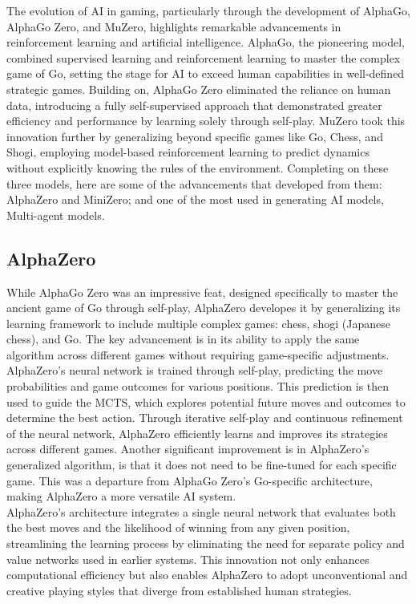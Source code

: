 The evolution of AI in gaming, particularly through the development of AlphaGo,
AlphaGo Zero, and MuZero, highlights remarkable advancements in reinforcement
learning and artificial intelligence. AlphaGo, the pioneering model, combined
supervised learning and reinforcement learning to master the complex game of
Go, setting the stage for AI to exceed human capabilities in well-defined
strategic games. Building on, AlphaGo Zero eliminated the reliance on human
data, introducing a fully self-supervised approach that demonstrated greater
efficiency and performance by learning solely through self-play. MuZero took
this innovation further by generalizing beyond specific games like Go, Chess,
and Shogi, employing model-based reinforcement learning to predict dynamics
without explicitly knowing the rules of the environment. Completing on these
three models, here are some of the advancements that developed from them:
AlphaZero and MiniZero; and one of the most used in generating AI models,
Multi-agent models.
\subsection*{AlphaZero}
While AlphaGo Zero was an impressive feat, designed specifically to master the
ancient game of Go through self-play, AlphaZero developes it by generalizing
its learning framework to include multiple complex games: chess, shogi
(Japanese chess), and Go. The key advancement is in its ability to apply the
same algorithm across different games without requiring game-specific
adjustments. AlphaZero's neural network is trained through self-play,
predicting the move probabilities and game outcomes for various positions. This
prediction is then used to guide the MCTS, which explores potential future
moves and outcomes to determine the best action. Through iterative self-play
and continuous refinement of the neural network, AlphaZero efficiently learns
and improves its strategies across different games\cite{AD3}. Another
significant improvement is in AlphaZero’s generalized algorithm, is that it
does not need to be fine-tuned for each specific game. This was a departure
from AlphaGo Zero’s Go-specific architecture, making AlphaZero a more versatile
AI system.\\ AlphaZero's architecture integrates a single neural network that
evaluates both the best moves and the likelihood of winning from any given
position, streamlining the learning process by eliminating the need for
separate policy and value networks used in earlier systems. This innovation not
only enhances computational efficiency but also enables AlphaZero to adopt
unconventional and creative playing styles that diverge from established human
strategies.
